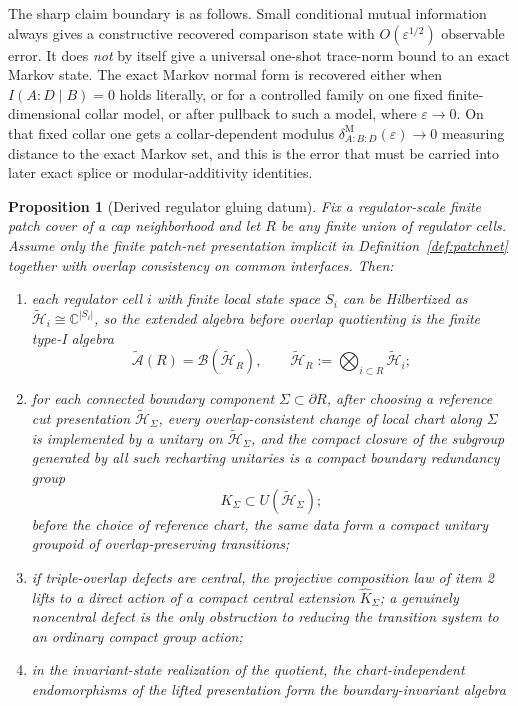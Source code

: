 \documentclass[11pt]{article}
\newtheorem{proposition}[theorem]{Proposition}
\begin{document}
The sharp claim boundary is as follows. Small conditional mutual information always gives a constructive recovered comparison state with \(O(\varepsilon^{1/2})\) observable error. It does \emph{not} by itself give a universal one-shot trace-norm bound to an exact Markov state. The exact Markov normal form is recovered either when \(I(A:D\mid B)=0\) holds literally, or for a controlled family on one fixed finite-dimensional collar model, or after pullback to such a model, where \(\varepsilon\to0\). On that fixed collar one gets a collar-dependent modulus \(\delta^{\mathrm M}_{A:B:D}(\varepsilon)\to0\) measuring distance to the exact Markov set, and this is the error that must be carried into later exact splice or modular-additivity identities.

\begin{proposition}[Derived regulator gluing datum]\label{prop:regulatedrealization}
Fix a regulator-scale finite patch cover of a cap neighborhood and let \(R\) be any finite union of regulator cells. Assume only the finite patch-net presentation implicit in Definition~\ref{def:patchnet} together with overlap consistency on common interfaces. Then:
\begin{enumerate}[leftmargin=2em]
\item each regulator cell \(i\) with finite local state space \(S_i\) can be Hilbertized as \(\tilde{\mathcal H}_i\cong \mathbb C^{|S_i|}\), so the extended algebra before overlap quotienting is the finite type-I algebra
\[
\widetilde{\mathcal A}(R)=\mathcal B(\tilde{\mathcal H}_R),
\qquad
\tilde{\mathcal H}_R:=\bigotimes_{i\subset R}\tilde{\mathcal H}_i;
\]
\item for each connected boundary component \(\Sigma\subset\partial R\), after choosing a reference cut presentation \(\tilde{\mathcal H}_\Sigma\), every overlap-consistent change of local chart along \(\Sigma\) is implemented by a unitary on \(\tilde{\mathcal H}_\Sigma\), and the compact closure of the subgroup generated by all such recharting unitaries is a compact boundary redundancy group
\[
K_\Sigma\subset U(\tilde{\mathcal H}_\Sigma);
\]
before the choice of reference chart, the same data form a compact unitary groupoid of overlap-preserving transitions;
\item if triple-overlap defects are central, the projective composition law of item 2 lifts to a direct action of a compact central extension \(\widehat K_\Sigma\); a genuinely noncentral defect is the only obstruction to reducing the transition system to an ordinary compact group action;
\item in the invariant-state realization of the quotient, the chart-independent endomorphisms of the lifted presentation form the boundary-invariant algebra

\end{enumerate}
\end{proposition}
\end{document}
